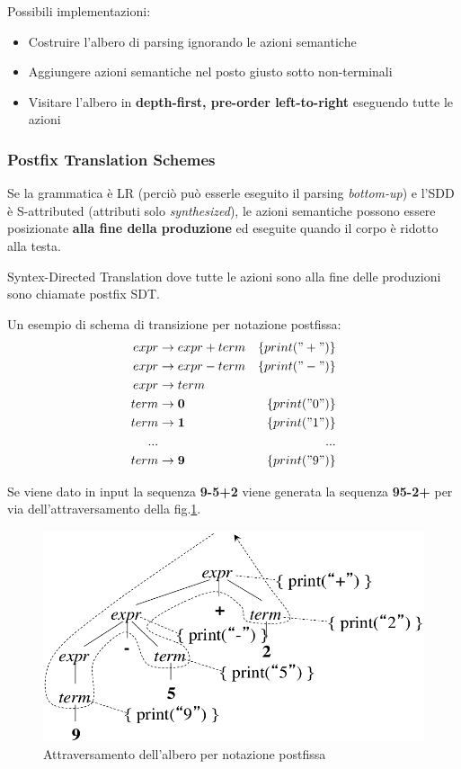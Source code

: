 Possibili implementazioni:
\begin{itemize}
\item Costruire l'albero di parsing ignorando le azioni semantiche
\item Aggiungere azioni semantiche nel posto giusto sotto non-terminali
\item Visitare l'albero in \textbf{depth-first, pre-order left-to-right}
eseguendo tutte le azioni
\end{itemize}

\subsubsection{Postfix Translation Schemes}
Se la grammatica \`e LR (perci\`o pu\`o esserle eseguito il parsing
\textit{bottom-up}) e l'SDD \`e S-attributed (attributi solo
\textit{synthesized}), le azioni semantiche possono essere posizionate
\textbf{alla fine della produzione} ed eseguite quando il corpo \`e ridotto alla
testa.

\begin{definition}
Syntex-Directed Translation dove tutte le azioni sono alla fine delle produzioni
sono chiamate postfix SDT.
\end{definition}

Un esempio di schema di transizione per notazione postfissa:
\begin{align*}
expr &\to expr + term  & \{print("+")\} \\
expr &\to expr - term  & \{print("-")\} \\
expr &\to term                          \\
term &\to \mathbf{0}   & \{print("0")\} \\
term &\to \mathbf{1}   & \{print("1")\} \\
...  &                 & ...            \\
term &\to \mathbf{9}   & \{print("9")\}
\end{align*}

Se viene dato in input la sequenza \textbf{9-5+2} viene generata la sequenza
\textbf{95-2+} per via dell'attraversamento della fig.\ref{img:postfix_tree}.

\begin{figure}[H]
  \centering
  \includegraphics[scale=0.5]{res/image/postfix_tree}
  \caption{Attraversamento dell'albero per notazione postfissa}
  \label{img:postfix_tree}
\end{figure}

